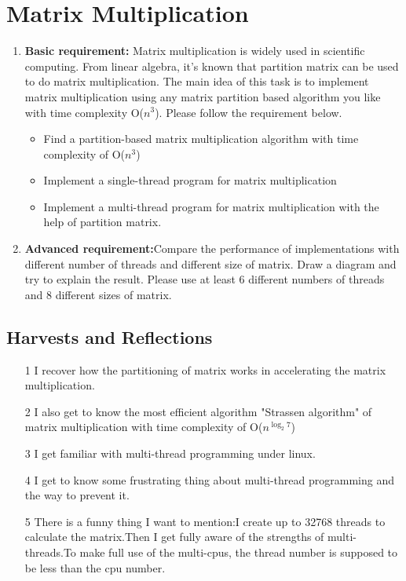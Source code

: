 \documentclass[]{article}
\begin{document}
\section{Matrix Multiplication}
\begin{enumerate}
    \item \textbf{Basic requirement:} Matrix multiplication is widely used in scientific computing. From linear
    algebra, it’s known that partition matrix can be used to do matrix multiplication. The main idea
    of this task is to implement matrix multiplication using any matrix partition based algorithm
    you like with time complexity O($n^3$). Please follow the requirement below.
    \begin{itemize}
        \item Find a partition-based matrix multiplication algorithm with time complexity of O($n^3$)
        \item Implement a single-thread program for matrix multiplication
        \item Implement a multi-thread program for matrix multiplication with the help of partition
        matrix.
    \end{itemize}
    \item \textbf{Advanced requirement:}Compare the performance of implementations with different number
    of threads and different size of matrix. Draw a diagram and try to explain the result. Please use
    at least 6 different numbers of threads and 8 different sizes of matrix.
    
\end{enumerate}
\subsection*{Harvests and Reflections}
\begin{enumerate}
    \item[1] I recover how the partitioning of matrix works in accelerating the matrix multiplication.
    \item[2] I also get to know the most efficient algorithm "Strassen algorithm" of matrix multiplication with time complexity of O($n^{\log_2 7}$) 
    \item[3] I get familiar with multi-thread programming under linux.
    \item[4] I get to know some frustrating thing about multi-thread programming and the way to prevent it.
    \item[5] There is a funny thing I want to mention:I create up to 32768 threads to calculate the matrix.Then I get fully aware of the strengths of multi-threads.To make full use of the multi-cpus, the thread number is supposed to be less than the cpu number.
\end{enumerate}
\end{document}
